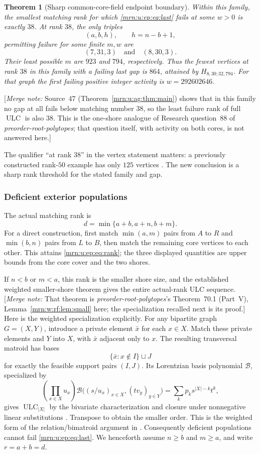 \documentclass[11pt,a4paper]{article}
\newtheorem{theorem}{Theorem}[section]
\theoremstyle{remark}\newtheorem{remark}[theorem]{Remark}
\newcommand{\ULC}{\operatorname{ULC}}      %
\newcommand{\mnote}[1]{[\textit{Merge note:} #1]}
\newcommand{\prp}{\emph{preorder-root-polytopes}}
\begin{document}
\begin{theorem}[Sharp common-core-field endpoint boundary]\label{mrn:u:ep:thm:main}
Within this family, the smallest matching rank for which \eqref{mrn:u:ep:eq:last} fails at some $w>0$ is exactly $38$. At rank $38$, the only triples
\[
 (a,b,h),\qquad h=n-b+1,
\]
permitting failure for some finite $m,w$ are
\[
 (7,31,3)\quad\text{and}\quad(8,30,3).
\]
Their least possible $m$ are $923$ and $794$, respectively. Thus the fewest vertices at rank $38$ in this family with a failing last gap is $864$, attained by $H_{8,30;32,794}$. For that graph the first failing positive integer activity is $w=292602646$.
\end{theorem}
\mnote{Source~47 (Theorem~\ref{mrn:u:ag:thm:main}) shows that in this family no gap at all fails below matching number $38$, so the least failure rank of full $\ULC$ is also $38$. This is the one-shore analogue of Research question~88 of \prp; that question itself, with activity on both cores, is not answered here.}

The qualifier ``at rank $38$'' in the vertex statement matters: a previously constructed rank-$50$ example has only $125$ vertices \cite{b:m73}. The new conclusion is a sharp rank threshold for the stated family and gap.

\subsubsection{Deficient exterior populations}
The actual matching rank is
\begin{equation}\label{mrn:u:ep:eq:rank}
 d=\min\{a+b,a+n,b+m\}.
\end{equation}
For a direct construction, first match $\min(a,m)$ pairs from $A$ to $R$ and $\min(b,n)$ pairs from $L$ to $B$, then match the remaining core vertices to each other. This attains \eqref{mrn:u:ep:eq:rank}; the three displayed quantities are upper bounds from the core cover and the two shores.

If $n<b$ or $m<a$, this rank is the smaller shore size, and the established weighted smaller-shore theorem gives the entire actual-rank ULC sequence. \mnote{That theorem is \prp's Theorem~70.1 (Part~V), Lemma~\ref{mrn:w:rf:lem:small} here; the specialization recalled next is its proof.} Here is the weighted specialization explicitly. For any bipartite graph $G=(X,Y)$, introduce a private element $\bar x$ for each $x\in X$. Match these private elements and $Y$ into $X$, with $\bar x$ adjacent only to $x$. The resulting transversal matroid has bases
\[
 \{\bar x:x\notin I\}\sqcup J
\]
for exactly the feasible support pairs $(I,J)$. Its Lorentzian basis polynomial $\mathcal B$, specialized by
\[
 \left(\prod_{x\in X}u_x\right)
 \mathcal B\big((s/u_x)_{x\in X},(tv_y)_{y\in Y}\big)
 =\sum_k p_k s^{|X|-k}t^k,
\]
gives $\ULC_{|X|}$ by the bivariate characterization and closure under nonnegative linear substitutions \cite{b:BH}. Transpose to obtain the smaller order. This is the weighted form of the relation/bimatroid argument in \cite{b:RU}. Consequently deficient populations cannot fail \eqref{mrn:u:ep:eq:last}. We henceforth assume $n\ge b$ and $m\ge a$, and write $r=a+b=d$.
\end{document}
